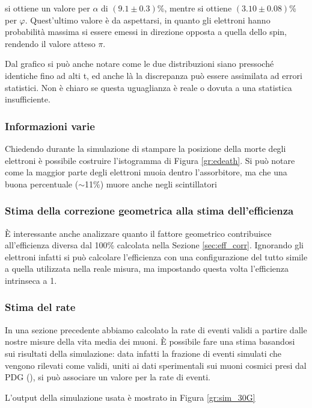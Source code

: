 si ottiene un valore per $\alpha$ di $(9.1 \pm 0.3)$\%, mentre si ottiene $(3.10 \pm 0.08)$\% per $\varphi$. Quest'ultimo valore \`e da aspettarsi, in quanto gli elettroni hanno probabilit\`a massima si essere emessi in direzione opposta a quella dello spin, rendendo il valore atteso $\pi$.

Dal grafico si pu\`o anche notare come le due distribuzioni siano pressoch\'e identiche fino ad alti t, ed anche l\`a la discrepanza pu\`o essere assimilata ad errori statistici. Non \`e chiaro se questa uguaglianza \`e reale o dovuta a una statistica insufficiente.

\subsubsection{Informazioni varie}
Chiedendo durante la simulazione di stampare la posizione della morte degli elettroni \`e possibile costruire l'istogramma di Figura \ref{gr:edeath}. Si pu\`o notare come la maggior parte degli elettroni muoia dentro l'assorbitore, ma che una buona percentuale ($\sim$11\%) muore anche negli scintillatori


\subsubsection{Stima della correzione geometrica alla stima dell'efficienza}
\`E interessante anche analizzare quanto il fattore geometrico contribuisce all'efficienza diversa dal 100\% calcolata nella Sezione \ref{sec:eff_corr}. Ignorando gli elettroni infatti si pu\`o calcolare l'efficienza con una configurazione del tutto simile a quella utilizzata nella reale misura, ma impostando questa volta l'efficienza intrinseca a 1.

\subsubsection{Stima del rate}
In una sezione precedente abbiamo calcolato la rate di eventi validi a partire dalle nostre misure della vita media dei muoni. 
\`E possibile fare una stima basandosi sui risultati della simulazione: data infatti la frazione di eventi simulati che vengono rilevati come validi, uniti ai dati sperimentali sui muoni cosmici presi dal PDG (\cite{bib:Patrignani:2016xqp}), si pu\`o associare un valore per la rate di eventi.

L'output della simulazione usata \`e mostrato in Figura \ref{gr:sim_30G}

